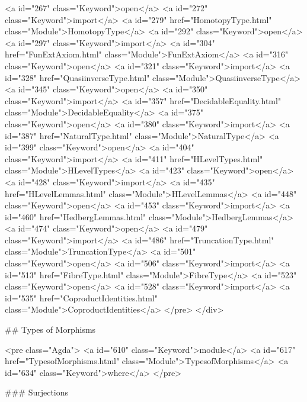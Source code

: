 <a id="267" class="Keyword">open</a> <a id="272" class="Keyword">import</a> <a id="279" href="HomotopyType.html" class="Module">HomotopyType</a>
<a id="292" class="Keyword">open</a> <a id="297" class="Keyword">import</a> <a id="304" href="FunExtAxiom.html" class="Module">FunExtAxiom</a>
<a id="316" class="Keyword">open</a> <a id="321" class="Keyword">import</a> <a id="328" href="QuasiinverseType.html" class="Module">QuasiinverseType</a>
<a id="345" class="Keyword">open</a> <a id="350" class="Keyword">import</a> <a id="357" href="DecidableEquality.html" class="Module">DecidableEquality</a>
<a id="375" class="Keyword">open</a> <a id="380" class="Keyword">import</a> <a id="387" href="NaturalType.html" class="Module">NaturalType</a>
<a id="399" class="Keyword">open</a> <a id="404" class="Keyword">import</a> <a id="411" href="HLevelTypes.html" class="Module">HLevelTypes</a>
<a id="423" class="Keyword">open</a> <a id="428" class="Keyword">import</a> <a id="435" href="HLevelLemmas.html" class="Module">HLevelLemmas</a>
<a id="448" class="Keyword">open</a> <a id="453" class="Keyword">import</a> <a id="460" href="HedbergLemmas.html" class="Module">HedbergLemmas</a>
<a id="474" class="Keyword">open</a> <a id="479" class="Keyword">import</a> <a id="486" href="TruncationType.html" class="Module">TruncationType</a>
<a id="501" class="Keyword">open</a> <a id="506" class="Keyword">import</a> <a id="513" href="FibreType.html" class="Module">FibreType</a>
<a id="523" class="Keyword">open</a> <a id="528" class="Keyword">import</a> <a id="535" href="CoproductIdentities.html" class="Module">CoproductIdentities</a>
</pre>
</div>

## Types of Morphisms

<pre class="Agda">
<a id="610" class="Keyword">module</a> <a id="617" href="TypesofMorphisms.html" class="Module">TypesofMorphisms</a> <a id="634" class="Keyword">where</a>
</pre>

### Surjections

